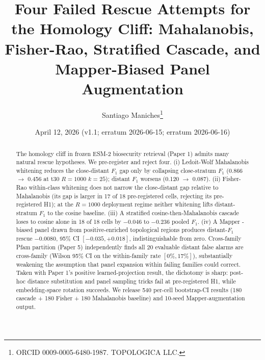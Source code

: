 \documentclass[11pt]{article}
\title{Four Failed Rescue Attempts for the Homology Cliff: Mahalanobis, Fisher-Rao, Stratified Cascade, and Mapper-Biased Panel Augmentation}
\author{Santiago Maniches\thanks{ORCID 0009-0005-6480-1987. TOPOLOGICA LLC.}}
\date{April 12, 2026 (v1.1; erratum 2026-06-15; erratum 2026-06-16)}
\begin{document}
\maketitle

\begin{abstract}
The homology cliff in frozen ESM-2 \cite{lin2023evolutionary} biosecurity retrieval (Paper 1) admits many natural rescue hypotheses. We pre-register and reject four. (i) Ledoit-Wolf \cite{ledoit2004} Mahalanobis whitening reduces the close-distant $F_1$ gap only by collapsing close-stratum $F_1$ (0.866 $\to$ 0.456 at t30 $R{=}1000$ $k{=}25$); distant $F_1$ worsens (0.120 $\to$ 0.087). (ii) Fisher-Rao \cite{amari2016} within-class whitening does not narrow the close-distant gap relative to Mahalanobis (its gap is larger in 17 of 18 pre-registered cells, rejecting its pre-registered H1); at the $R{=}1000$ deployment regime neither whitening lifts distant-stratum $F_1$ to the cosine baseline. (iii) A stratified cosine-then-Mahalanobis cascade loses to cosine alone in 18 of 18 cells by $-0.046$ to $-0.236$ pooled $F_1$. (iv) A Mapper \cite{singh2007topological}-biased panel drawn from positive-enriched topological regions produces distant-$F_1$ rescue $-0.0080$, 95\% CI $[-0.035, +0.018]$, indistinguishable from zero. Cross-family Pfam partition (Paper 5) independently finds all 20 evaluable distant false alarms are cross-family (Wilson 95\% CI on the within-family rate $[0\%, 17\%]$), substantially weakening the assumption that panel expansion within failing families could correct. Taken with Paper 1's positive learned-projection result, the dichotomy is sharp: post-hoc distance substitution and panel sampling tricks fail at pre-registered H1, while embedding-space rotation succeeds. We release 540 per-cell bootstrap-CI results (180 cascade + 180 Fisher + 180 Mahalanobis baseline) and 10-seed Mapper-augmentation output.
\end{abstract}
\end{document}
